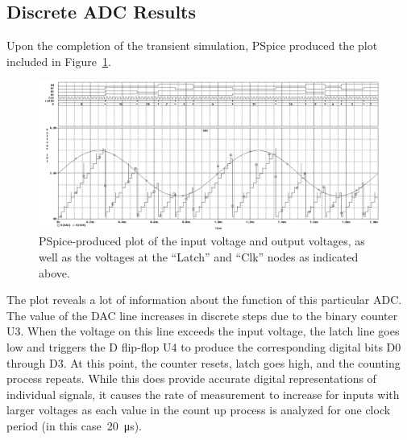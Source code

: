 \subsection{Discrete ADC Results}
Upon the completion of the transient simulation, PSpice produced the plot
included in Figure~\ref{f:adc_plot}.
%
\begin{figure}[H]
\centering
	\includegraphics[width=.8\textwidth]{img/plot/part2_plot.PNG}
	\parbox{.8\textwidth}{
	\caption[Discrete ADC --- Results]{PSpice-produced plot of the input
	voltage and output voltages, as well as the voltages at the ``Latch'' and
	``Clk'' nodes as indicated above.}
	\label{f:adc_plot}}
\end{figure}
%
The plot reveals a lot of information about the function of this particular
ADC.  The value of the DAC line increases in discrete steps due to the binary
counter U3.  When the voltage on this line exceeds the input voltage, the latch
line goes low and triggers the D flip-flop U4 to produce the corresponding
digital bits D0 through D3.  At this point, the counter resets, latch goes
high, and the counting process repeats.  While this does provide accurate
digital representations of individual signals, it causes the rate of
measurement to increase for inputs with larger voltages as each value in the
count up process is analyzed for one clock period (in this
case~\SI{20}{\micro\second}).
